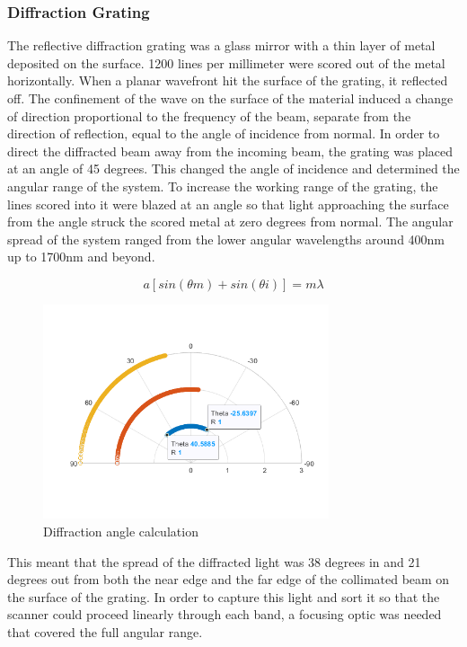 \subsubsection{Diffraction Grating} The reflective diffraction grating was a glass mirror with a thin layer of metal deposited on the surface. 1200 lines per millimeter were scored out of the metal horizontally. When a planar wavefront hit the surface of the grating, it reflected off. The confinement of the wave on the surface of the material induced a change of direction proportional to the frequency of the beam, separate from the direction of reflection, equal to the angle of incidence from normal. In order to direct the diffracted beam away from the incoming beam, the grating was placed at an angle of 45 degrees. This changed the angle of incidence and determined the angular range of the system. To increase the working range of the grating, the lines scored into it were blazed at an angle so that light approaching the surface from the angle struck the scored metal at zero degrees from normal. The angular spread of the system ranged from the lower angular wavelengths around 400nm up to 1700nm and beyond.

\begin{equation}
    a[sin(\theta m)+sin(\theta i)] = m\lambda
\end{equation}

\begin{figure}[H]
    \caption{Diffraction angle calculation}
    \centering
    \includegraphics[width=0.75\textwidth]{images/PolarPlot.png}
\end{figure}

This meant that the spread of the diffracted light was 38 degrees in and 21 degrees out from both the near edge and the far edge of the collimated beam on the surface of the grating. In order to capture this light and sort it so that the scanner could proceed linearly through each band, a focusing optic was needed that covered the full angular range.

